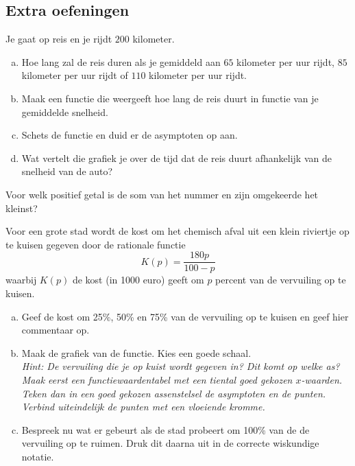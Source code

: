 \documentclass[12pt]{article}
\begin{document}
\subsection*{Extra oefeningen}

\begin{oefening}
Je gaat op reis en je rijdt $200$ kilometer.
\begin{enumerate}[(a)]
  \item Hoe lang zal de reis duren als je gemiddeld aan $65$ kilometer per uur rijdt, $85$ kilometer per uur rijdt of $110$ kilometer per uur rijdt.
  \item Maak een functie die weergeeft hoe lang de reis duurt in functie van je gemiddelde snelheid.
  \item Schets de functie en duid er de asymptoten op aan.
  \item Wat vertelt die grafiek je over de tijd dat de reis duurt afhankelijk van de snelheid van de auto?
\end{enumerate}
\end{oefening}

\begin{oefening}
Voor welk positief getal is de som van het nummer en zijn omgekeerde het kleinst?
\end{oefening}

\begin{oefening}
Voor een grote stad wordt de kost om het chemisch afval uit een klein riviertje op te kuisen gegeven door de rationale functie
$$K(p)=\frac{180p}{100-p}$$
waarbij $K(p)$ de kost (in 1000 euro) geeft om $p$ percent van de vervuiling op te kuisen.
\begin{enumerate}[(a)]
  \item Geef de kost om 25\%, 50\% en 75\% van de vervuiling op te kuisen en geef hier commentaar op.
  \item Maak de grafiek van de functie. Kies een goede schaal.\\
  {\small\em Hint: De vervuiling die je op kuist wordt gegeven in? Dit komt op welke as? Maak eerst een functiewaardentabel met een tiental goed gekozen $x$-waarden. Teken dan in een goed gekozen assenstelsel de asymptoten en de punten. Verbind uiteindelijk de punten met een vloeiende kromme.}
  \item Bespreek nu wat er gebeurt als de stad probeert om 100\% van de de vervuiling op te ruimen. Druk dit daarna uit in de correcte wiskundige notatie.
\end{enumerate}
\end{oefening}
\end{document}
